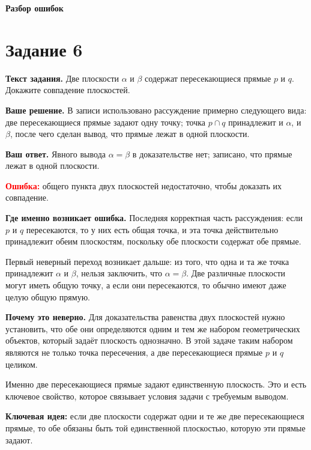 \documentclass[12pt,a4paper]{article}
\begin{document}
\newpage
\thispagestyle{empty}
\vspace*{0.42\textheight}
\begin{center}
{\LARGE\bfseries Разбор ошибок}
\end{center}
\newpage

\label{task:6}
\section*{Задание 6}

\textbf{Текст задания.}
Две плоскости $\alpha$ и $\beta$ содержат пересекающиеся прямые $p$ и $q$. Докажите совпадение плоскостей.

\textbf{Ваше решение.}
В записи использовано рассуждение примерно следующего вида: две пересекающиеся прямые задают одну точку; точка $p\cap q$ принадлежит и $\alpha$, и $\beta$, после чего сделан вывод, что прямые лежат в одной плоскости.

\textbf{Ваш ответ.}
Явного вывода $\alpha=\beta$ в доказательстве нет; записано, что прямые лежат в одной плоскости.

\textcolor{red}{\textbf{Ошибка:}} общего пункта двух плоскостей недостаточно, чтобы доказать их совпадение.

\textbf{Где именно возникает ошибка.}
Последняя корректная часть рассуждения: если $p$ и $q$ пересекаются, то у них есть общая точка, и эта точка действительно принадлежит обеим плоскостям, поскольку обе плоскости содержат обе прямые.

Первый неверный переход возникает дальше: из того, что одна и та же точка принадлежит $\alpha$ и $\beta$, нельзя заключить, что $\alpha=\beta$. Две различные плоскости могут иметь общую точку, а если они пересекаются, то обычно имеют даже целую общую прямую.

\textbf{Почему это неверно.}
Для доказательства равенства двух плоскостей нужно установить, что обе они определяются одним и тем же набором геометрических объектов, который задаёт плоскость однозначно. В этой задаче таким набором являются не только точка пересечения, а две пересекающиеся прямые $p$ и $q$ целиком.

Именно две пересекающиеся прямые задают единственную плоскость. Это и есть ключевое свойство, которое связывает условия задачи с требуемым выводом.

\textcolor{blue!60!black}{\textbf{Ключевая идея:}} если две плоскости содержат одни и те же две пересекающиеся прямые, то обе обязаны быть той единственной плоскостью, которую эти прямые задают.
\end{document}
